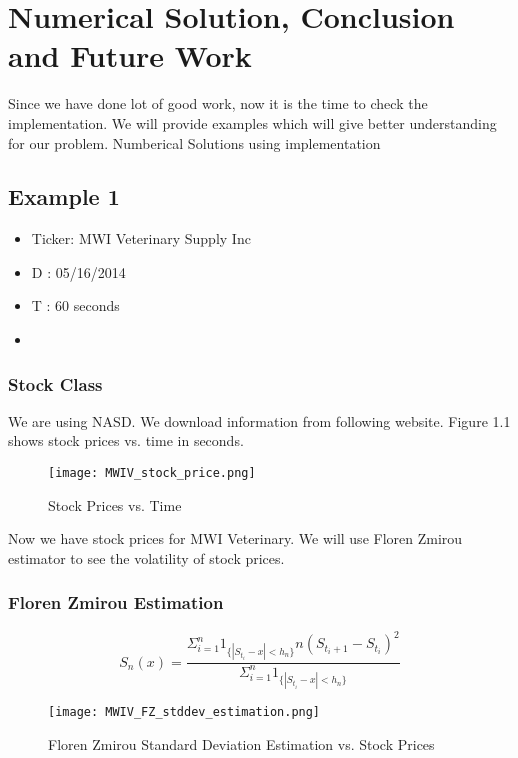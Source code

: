 \chapter{Numerical Solution, Conclusion and Future Work}
Since we have done lot of good work, now it is the time to check the implementation.
We will provide examples which will give better understanding for our problem.
{Numberical Solutions using implementation}
\section{Example 1}
\begin{itemize}
  \item Ticker: MWI Veterinary Supply Inc
  \item  D : 05/16/2014
  \item  T : 60 seconds
  \item 
\end{itemize}
\subsection{Stock Class}
We are using NASD. We download information from following website. Figure 1.1 shows stock prices vs. time in seconds.
\begin{figure}
  \centering
    \texttt{[image: MWIV\_stock\_price.png]}
  \caption{Stock Prices vs. Time}
  \label{fig:Stock Price}
\end{figure}
\newpage
Now we have stock prices for MWI Veterinary. We will use Floren Zmirou estimator to see the volatility of stock prices.
\subsection{Floren Zmirou Estimation}
\begin{center}
\begin{equation}\label{florenZmirouEquation}
S_n(x) = \frac{\Sigma_{i=1}^{n} 1_{\{|S_{t_i}-x|<h_n\}} n (S_{t_i+1}-S_{t_i})^2}{\Sigma_{i=1}^{n} 1_{\{|S_{t_i}-x|<h_n\}}}

\end{equation}
\end{center}
\begin{figure}
  \centering
    \texttt{[image: MWIV\_FZ\_stddev\_estimation.png]}
  \caption{Floren Zmirou Standard Deviation Estimation vs. Stock Prices}
  \label{fig:Floren Zmirou Estimation}
\end{figure}

